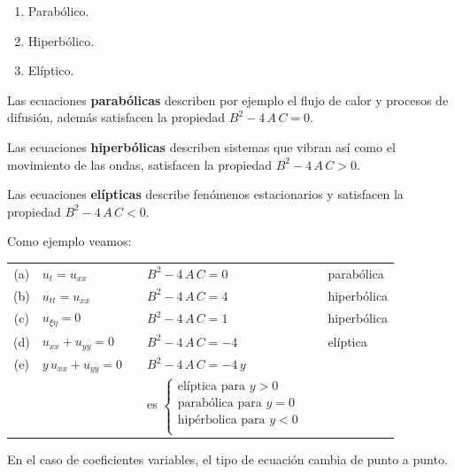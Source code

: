 \begin{enumerate}
\begin{enumerate}[label=(\alph*)]
\item Parabólico.
\item Hiperbólico.
\item Elíptico.
\end{enumerate}
Las ecuaciones \textbf{parabólicas} describen por ejemplo el flujo de calor y procesos de difusión, además satisfacen la propiedad $B^{2} - 4 \, A \, C = 0$.
\par
Las ecuaciones \textbf{hiperbólicas} describen sistemas que vibran así como el movimiento de las ondas, satisfacen la propiedad $B^{2} - 4 \, A \, C > 0$.
\par
Las ecuaciones \textbf{elípticas} describe fenómenos estacionarios y satisfacen la propiedad $B^{2} - 4 \, A \, C < 0$.
\par
Como ejemplo veamos:
\begin{table}[H]
\centering
\large
\begin{tabular}{c l l l l l}
(a) & \Large{$u_{t} = u_{xx}$} & & \large{$B^{2} - 4 \, A \, C = 0$} & & parabólica \\
(b) & \Large{$u_{tt} = u_{xx}$} & & \large{$B^{2} - 4 \, A \, C = 4$} & & hiperbólica \\
(c) & \Large{$u_{\xi \eta} = 0$} & & \large{$B^{2} - 4 \, A \, C = 1$} & & hiperbólica \\
(d) & \Large{$u_{xx} + u_{yy} = 0$} & & \large{$B^{2} - 4 \, A \, C = -4$} & & elíptica \\
(e) & \Large{$y \, u_{xx} + u_{yy} = 0$} & & \large{$B^{2} - 4 \, A \, C = - 4 \, y$} & & \\
 & & & es $\begin{cases}
    \mbox{elíptica para } y > 0 \\
    \mbox{parabólica para } y = 0 \\
    \mbox{hipérbolica para } y < 0 \\
    \end{cases}$ &
\end{tabular}
\end{table}
En el caso de coeficientes variables, el tipo de ecuación cambia de punto a punto.
\end{enumerate}

